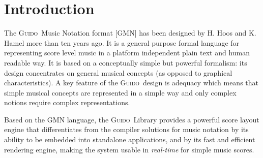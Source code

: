 \documentclass[twoside,10pt,a4paper]{article}
\affiliation{}{}
\affiliation{\paperauthorA, \paperauthorB, \paperauthorC}
  {Grame\\ Centre national de crétaion musicale, Lyon, France \\ {\tt \href{mailto:fober@grame.fr}{fober@grame.fr}}}
\title{\papertitle}
\newcommand{\Guido}		{\textsc{Guido}}
\begin{document}
    
\maketitle

\begin{abstract}
Based on the Guido Music Notation format, we have developed tools for music score \emph{"composition"} (in the etymological sense), i.e. operators that take scores both as target and arguments of high level transformations, applicable for example to the time domain (e.g. cutting the head or the tail of a score) or to the structural domains (e.g. putting scores in sequence or in parallel). 
Providing these operations at score level is particularly convenient to express music ideas and to compose these ideas in an homogeneous representation space. However, scores level composition gives raise to a set of issues related to the music notation consistency. This paper introduces the \Guido\ Music Notation format, presents the score composition operations, the notation issues and a proposal to solve them.
\end{abstract}


\section{Introduction}\label{sec:intro}
The \Guido\ Music Notation format [GMN] \cite{hoos98} has been designed by H. Hoos and K. Hamel more than ten years ago. It is a general purpose formal language for representing score level music in a platform independent plain text and human readable way. It is based on a conceptually simple but powerful formalism: its design concentrates on general musical concepts (as opposed to graphical characteristics). A key feature of the \Guido\ design is adequacy which means that simple musical concepts are represented in a simple way and only complex notions require complex representations.

Based on the GMN language, the \Guido\ Library \cite{daudin09a,Fober:04b} provides a powerful score layout engine that differentiates from the compiler solutions for music notation \cite{lilypond03,musixtex} by its ability to be embedded into standalone applications, and by its fast and efficient rendering engine, making the system usable in \emph{real-time} for simple music scores.
\end{document}
